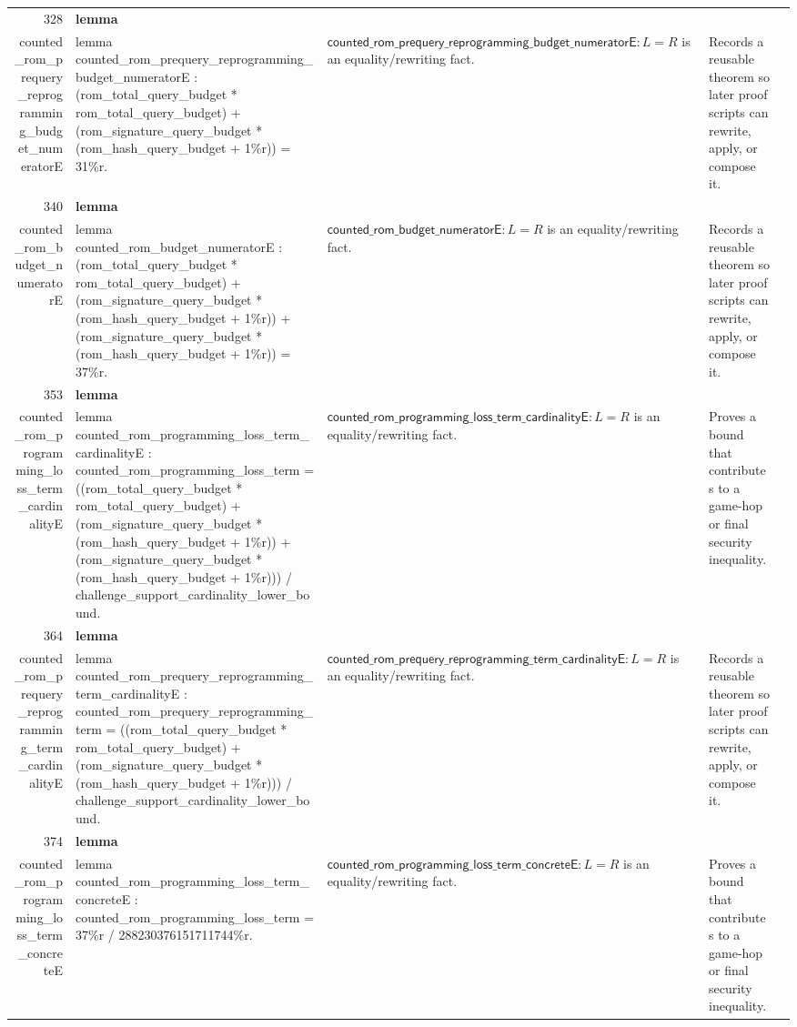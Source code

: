 \documentclass[10pt]{article}
\newcommand{\ec}[1]{\begingroup\ttfamily\scriptsize #1\endgroup}
\begin{document}
\begin{longtable}{r L{0.17\textwidth} L{0.26\textwidth} L{0.27\textwidth} L{0.20\textwidth}}
328 & \textbf{lemma}\\\ec{counted\_rom\_prequery\_reprogramming\_budget\_numeratorE} & \ec{lemma counted\_rom\_prequery\_reprogramming\_budget\_numeratorE : (rom\_total\_query\_budget * rom\_total\_query\_budget) + (rom\_signature\_query\_budget * (rom\_hash\_query\_budget + 1\%r)) = 31\%r.} & \(\mathsf{counted\_rom\_prequery\_reprogramming\_budget\_numeratorE} : L = R\) is an equality/rewriting fact. & Records a reusable theorem so later proof scripts can rewrite, apply, or compose it. \\
340 & \textbf{lemma}\\\ec{counted\_rom\_budget\_numeratorE} & \ec{lemma counted\_rom\_budget\_numeratorE : (rom\_total\_query\_budget * rom\_total\_query\_budget) + (rom\_signature\_query\_budget * (rom\_hash\_query\_budget + 1\%r)) + (rom\_signature\_query\_budget * (rom\_hash\_query\_budget + 1\%r)) = 37\%r.} & \(\mathsf{counted\_rom\_budget\_numeratorE} : L = R\) is an equality/rewriting fact. & Records a reusable theorem so later proof scripts can rewrite, apply, or compose it. \\
353 & \textbf{lemma}\\\ec{counted\_rom\_programming\_loss\_term\_cardinalityE} & \ec{lemma counted\_rom\_programming\_loss\_term\_cardinalityE : counted\_rom\_programming\_loss\_term = ((rom\_total\_query\_budget * rom\_total\_query\_budget) + (rom\_signature\_query\_budget * (rom\_hash\_query\_budget + 1\%r)) + (rom\_signature\_query\_budget * (rom\_hash\_query\_budget + 1\%r))) / challenge\_support\_cardinality\_lower\_bound.} & \(\mathsf{counted\_rom\_programming\_loss\_term\_cardinalityE} : L = R\) is an equality/rewriting fact. & Proves a bound that contributes to a game-hop or final security inequality. \\
364 & \textbf{lemma}\\\ec{counted\_rom\_prequery\_reprogramming\_term\_cardinalityE} & \ec{lemma counted\_rom\_prequery\_reprogramming\_term\_cardinalityE : counted\_rom\_prequery\_reprogramming\_term = ((rom\_total\_query\_budget * rom\_total\_query\_budget) + (rom\_signature\_query\_budget * (rom\_hash\_query\_budget + 1\%r))) / challenge\_support\_cardinality\_lower\_bound.} & \(\mathsf{counted\_rom\_prequery\_reprogramming\_term\_cardinalityE} : L = R\) is an equality/rewriting fact. & Records a reusable theorem so later proof scripts can rewrite, apply, or compose it. \\
374 & \textbf{lemma}\\\ec{counted\_rom\_programming\_loss\_term\_concreteE} & \ec{lemma counted\_rom\_programming\_loss\_term\_concreteE : counted\_rom\_programming\_loss\_term = 37\%r / 288230376151711744\%r.} & \(\mathsf{counted\_rom\_programming\_loss\_term\_concreteE} : L = R\) is an equality/rewriting fact. & Proves a bound that contributes to a game-hop or final security inequality. \\

\end{longtable}
\end{document}
